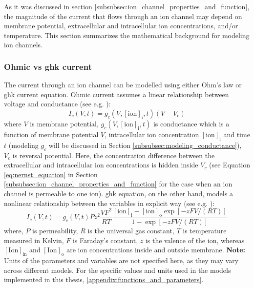 \documentclass[../main.tex]{subfiles}
\begin{document}
As it was discussed in section \ref{subsubsec:ion_channel_properties_and_function}, the magnitude of the current that flows through an ion channel may depend on membrane potential, extracellular and intracellular ion concentrations, and/or temperature. This section summarizes the mathematical background for modeling ion channels.

\subsubsection{Ohmic vs \texorpdfstring{\gls{ghk}}{GHK} current}

The current through an ion channel can be modelled using either Ohm's law or
\gls{ghk} current equation. Ohmic current assumes a linear relationship between
voltage and conductance (see e.g. \parencite{huguenardSimulationCurrentsInvolved1992,amarilloInterplaySevenSubthreshold2014}):
\begin{equation}\label{eq:ohmic_current}
    I_{c}(V,t) = g_c(V,[\text{ion}]_{\text{i}},t)(V - V_c)
\end{equation}
where $V$ is membrane potential, $g_c(V,[\text{ion}]_{\text{i}},t)$ is conductance which is a function of membrane potential $V$, intracellular ion concentration $[\text{ion}]_{\text{i}}$ and time $t$ (modeling $g_c$ will be discussed in Section \ref{subsubsec:modeling_conductance}), $V_c$ is reversal potential. Here, the concentration difference between the extracellular and intracellular ion concentrations is hidden inside $V_c$ (see Equation \ref{eq:nernst_equation} in Section \ref{subsubsec:ion_channel_properties_and_function} for the case when an ion channel is permeable to one ion).
\gls{ghk} equation, on the other hand, models a nonlinear relationship between the variables in
explicit way (see e.g. \parencite{huguenardSimulationCurrentsInvolved1992,destexheDendriticLowthresholdCalcium1998}):
\begin{equation}\label{eq:ghk_current}
    I_c(V,t) = g_c(V,t) P z^2 \frac{VF^2}{RT}\frac{[\text{ion}]_{\text{i}} - [\text{ion}]_{\text{o}} \exp{[-zFV/(RT)]} }{1 - \exp{[-zFV/(RT)]}}
\end{equation}
where, $P$ is permeability, $R$ is the universal gas constant, $T$ is temperature measured
in Kelvin, $F$ is Faraday's constant, $z$ is the valence of the ion,
whereas $[\text{Ion}]_{\text{in}}$ and $[\text{Ion}]_{\text{o}}$ are ion concentrations inside and outside membrane. \textbf{Note:} Units of the parameters and variables are not specified here, as they may vary across different models. For the specific values and units used in the models implemented in this thesis, \ref{appendix:functions_and_parameters}.
\end{document}

